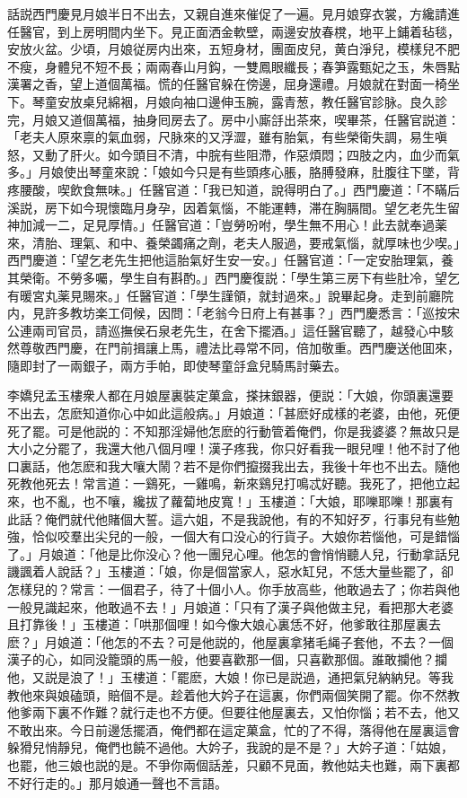 話説西門慶見月娘半日不出去，又親自進來催促了一遍。見月娘穿衣裳，方纔請進任醫官，到上房明間内坐下。見正面洒金軟壁，兩邊安放春櫈，地平上鋪着毡毯，安放火盆。少頃，月娘従房内出來，五短身材，團面皮兒，黄白淨兒，模樣兒不肥不瘦，身體兒不短不長；兩兩春山月鈎，一雙鳳眼纖長；春笋露甄妃之玉，朱唇點漢署之香，望上道個萬福。慌的任醫官躲在傍邊，屈身還禮。月娘就在對面一椅坐下。琴童安放桌兒綿裀，月娘向袖口邊伸玉腕，露青葱，教任醫官診脉。良久診完，月娘又道個萬福，抽身囘房去了。房中小廝㧱出茶來，喫畢茶，任醫官説道：「老夫人原來禀的氣血弱，尺脉來的又浮澀，雖有胎氣，有些榮衛失調，易生嗔怒，又動了肝火。如今頭目不清，中脘有些阻滯，作惡煩悶；四肢之内，血少而氣多。」月娘使出琴童來說：「娘如今只是有些頭疼心脹，胳膊發麻，肚腹往下墜，背疼腰酸，喫飲食無味。」任醫官道：「我已知道，說得明白了。」西門慶道：「不瞞后溪説，房下如今現懷臨月身孕，因着氣惱，不能運轉，滞在胸膈間。望乞老先生留神加減一二，足見厚情。」任醫官道：「豈勞吩咐，學生無不用心！此去就奉過薬來，清胎、理氣、和中、養榮蠲痛之劑，老夫人服過，要戒氣惱，就厚味也少喫。」西門慶道：「望乞老先生把他這胎氣好生安一安。」任醫官道：「一定安胎理氣，養其榮衛。不勞多囑，學生自有斟酌。」西門慶復説：「學生第三房下有些肚冷，望乞有暖宮丸薬見賜來。」任醫官道：「學生謹領，就封過來。」說畢起身。走到前廳院内，見許多教坊楽工伺候，因問：「老翁今日府上有甚事？」西門慶悉言：「巡按宋公連兩司官员，請巡撫侯石泉老先生，在舍下擺酒。」這任醫官聽了，越發心中駭然尊敬西門慶，在門前揖讓上馬，禮法比尋常不同，倍加敬重。西門慶送他囬來，隨即封了一兩銀子，兩方手帕，即使琴童㧱盒兒騎馬討藥去。

李嬌兒孟玉樓衆人都在月娘屋裏裝定菓盒，搽抹銀器，便説：「大娘，你頭裏還要不出去，怎麽知道你心中如此這般病。」月娘道：「甚麽好成樣的老婆，由他，死便死了罷。可是他説的：不知那淫婦他怎麽的行動管着俺們，你是我婆婆？無故只是大小之分罷了，我還大他八個月哩！漢子疼我，你只好看我一眼兒哩！他不討了他口裏話，他怎麽和我大嚷大鬧？若不是你們攛掇我出去，我後十年也不出去。隨他死教他死去！常言道：一鷄死，一雞鳴，新來鷄兒打鳴忒好聽。我死了，把他立起來，也不亂，也不嚷，纔拔了蘿蔔地皮寬！」玉樓道：「大娘，耶嚛耶嚛！那裏有此話？俺們就代他賭個大誓。這六姐，不是我說他，有的不知好歹，行事兒有些勉強，恰似咬羣出尖兒的一般，一個大有口没心的行貨子。大娘你若惱他，可是錯惱了。」月娘道：「他是比你没心？他一團兒心哩。他怎的會悄悄聽人兒，行動拿話兒譏諷着人說話？」玉樓道：「娘，你是個當家人，惡水缸兒，不恁大量些罷了，卻怎樣兒的？常言：一個君子，待了十個小人。你手放高些，他敢過去了；你若與他一般見識起來，他敢過不去！」月娘道：「只有了漢子與他做主兒，看把那大老婆且打靠後！」玉樓道：「哄那個哩！如今像大娘心裏恁不好，他爹敢往那屋裏去麽？」月娘道：「他怎的不去？可是他説的，他屋裏拿猪毛䋲子套他，不去？一個漢子的心，如同没籠頭的馬一般，他要喜歡那一個，只喜歡那個。誰敢攔他？攔他，又説是浪了！」玉樓道：「罷麽，大娘！你已是説過，通把氣兒納納兒。等我教他來與娘磕頭，賠個不是。趁着他大妗子在這裏，你們兩個笑開了罷。你不然教他爹兩下裏不作難？就行走也不方便。但要往他屋裏去，又怕你惱；若不去，他又不敢出來。今日前邊恁擺酒，俺們都在這定菓盒，忙的了不得，落得他在屋裏這會躲猾兒悄靜兒，俺們也饒不過他。大妗子，我說的是不是？」大妗子道：「姑娘，也罷，他三娘也説的是。不爭你兩個話差，只顧不見面，教他姑夫也難，兩下裏都不好行走的。」那月娘通一聲也不言語。

